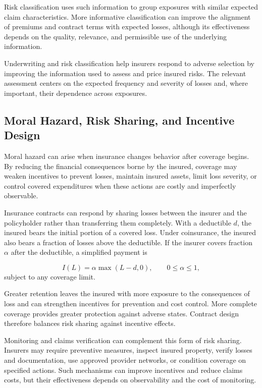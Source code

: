 Risk classification uses such information to group exposures with similar expected claim characteristics. More informative classification can improve the alignment of premiums and contract terms with expected losses, although its effectiveness depends on the quality, relevance, and permissible use of the underlying information.

Underwriting and risk classification help insurers respond to adverse selection by improving the information used to assess and price insured risks. The relevant assessment centers on the expected frequency and severity of losses and, where important, their dependence across exposures.

\subsection{Moral Hazard, Risk Sharing, and Incentive Design}

Moral hazard can arise when insurance changes behavior after coverage begins. By reducing the financial consequences borne by the insured, coverage may weaken incentives to prevent losses, maintain insured assets, limit loss severity, or control covered expenditures when these actions are costly and imperfectly observable.

Insurance contracts can respond by sharing losses between the insurer and the policyholder rather than transferring them completely. With a deductible $d$, the insured bears the initial portion of a covered loss. Under coinsurance, the insured also bears a fraction of losses above the deductible. If the insurer covers fraction $\alpha$ after the deductible, a simplified payment is


\begin{equation}
I(L)
=\alpha\max(L-d,0),
\qquad 0\leq\alpha\leq 1,
\label{eq:ch15-coinsurance-payoff}
\end{equation}
subject to any coverage limit.

Greater retention leaves the insured with more exposure to the consequences of loss and can strengthen incentives for prevention and cost control. More complete coverage provides greater protection against adverse states. Contract design therefore balances risk sharing against incentive effects.

Monitoring and claims verification can complement this form of risk sharing. Insurers may require preventive measures, inspect insured property, verify losses and documentation, use approved provider networks, or condition coverage on specified actions. Such mechanisms can improve incentives and reduce claims costs, but their effectiveness depends on observability and the cost of monitoring.

